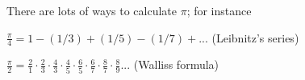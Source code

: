   There are lots of ways to calculate $ \pi $; for instance
\par
 $ \frac{\pi}{4} = 1 - (1/3) + (1/5) - (1/7) + ... $ (Leibnitz's series)
\par
 $ \frac{\pi}{2} = \frac{2}{1} \cdot \frac{2}{3} \cdot
\frac{4}{3} \cdot \frac{4}{5} \cdot \frac{6}{5} \cdot \frac{6}{7} \cdot
\frac{8}{7} \cdot \frac{8}{9} ... $ (Walliss formula)